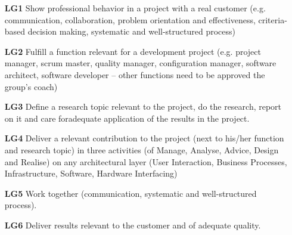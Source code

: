 \begin{itemize}
	\item[\textbf{LG1}] Show professional behavior in a project with a real customer (e.g. communication, collaboration, problem orientation and effectiveness, criteria-based decision making, systematic and well-structured process)
	\item[\textbf{LG2}] Fulfill a function relevant for a development project (e.g. project manager, scrum master, quality manager, configuration manager, software architect, software developer – other functions need to be approved the group’s coach)
	\item[\textbf{LG3}] Define a research topic relevant to the project, do the research, report on it and care foradequate application of the results in the project.
	\item[\textbf{LG4}] Deliver a relevant contribution to the project (next to his/her function and research topic) in three activities (of Manage, Analyse, Advice, Design and Realise) on any architectural layer (User Interaction, Business Processes, Infrastructure, Software, Hardware Interfacing)
	\item[\textbf{LG5}] Work together (communication, systematic and well-structured process).
	\item[\textbf{LG6}] Deliver results relevant to the customer and of adequate quality.
\end{itemize}
\label{table:learninggoals}


